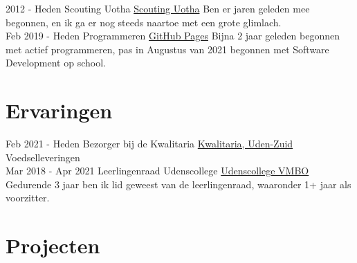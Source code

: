 \documentclass[letterpaper]{twentysecondcv} %
\begin{document}
    \begin{twenty} %
        \twentyitem
        {2012 -}
        {Heden}
        {Scouting Uotha}
        {\href{https://www.uotha.nl/}{Scouting Uotha}}
        {}
        { Ben er jaren geleden mee begonnen, en ik ga er nog steeds naartoe met een grote glimlach.}\\
        \twentyitem
        {Feb 2019 -}
        {Heden}
        {Programmeren}
        {\href{https://tais993.github.io/}{GitHub Pages}}
        {}
        {
            Bijna 2 jaar geleden begonnen met actief programmeren, pas in Augustus van 2021 begonnen met Software Development op school.
        }
    \end{twenty}

    \vspace{6mm}




    \section{Ervaringen}
    \begin{twenty} %
        \twentyitem
        {Feb 2021 -}
        {Heden}
        {Bezorger bij de Kwalitaria}
        {\href{https://kwalitaria.nl/uden-zuid/uden-zuid/}{Kwalitaria, Uden-Zuid}}
        {}
        {Voedselleveringen}\\
        \twentyitem
        {Mar 2018 -}
        {Apr 2021}
        {Leerlingenraad Udenscollege}
        {\href{https://www.udenscollege.nl/vmbo/startpagina-vmbo/}{Udenscollege VMBO}}
        {}
        {
            Gedurende 3 jaar ben ik lid geweest van de leerlingenraad, waaronder 1+ jaar als voorzitter.
        }
    \end{twenty}

    \vspace{6mm}




    \section{Projecten}
\end{document}
